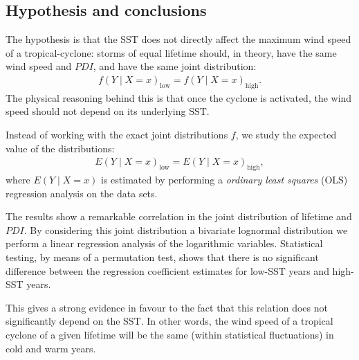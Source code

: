 \subsection{Hypothesis and conclusions}\label{sec:intro-hypothesis}
The hypothesis is that the $\text{SST}$ does not directly affect the maximum wind speed of a tropical-cyclone: storms of equal lifetime should, in theory, have the same wind speed and $PDI$, and have the same joint distribution:
\begin{align}\label{eq:hypothesis}
	f(Y \mid X = x)_{\text{low}} = f(Y \mid X = x)_{\text{high}} .
\end{align}
The physical reasoning behind this is that once the cyclone is activated, the wind speed should not depend on its underlying $\text{SST}$.

Instead of working with the exact joint
distributions $f$, we study the expected value of the distributions:
\begin{align}
	E(Y \mid X = x )_{\text{low}} = E(Y \mid X = x )_{\text{high}},
\end{align}
where $E(Y \mid X = x )$ is estimated by performing a \emph{ordinary least squares} (OLS) regression analysis on the data sets.

\bigskip
The results show a remarkable correlation in the joint distribution of lifetime and $PDI$. By considering this joint distribution a bivariate lognormal distribution we perform a linear regression analysis of the logarithmic variables. Statistical testing, by means of a permutation test, shows that there is no significant difference between the regression coefficient estimates for low-SST years and high-SST years.

This gives a strong evidence in favour to the fact that this relation does not significantly depend on the SST. In other words, the wind speed of a tropical cyclone of a given lifetime will be the same (within statistical fluctuations) in cold and warm years.

